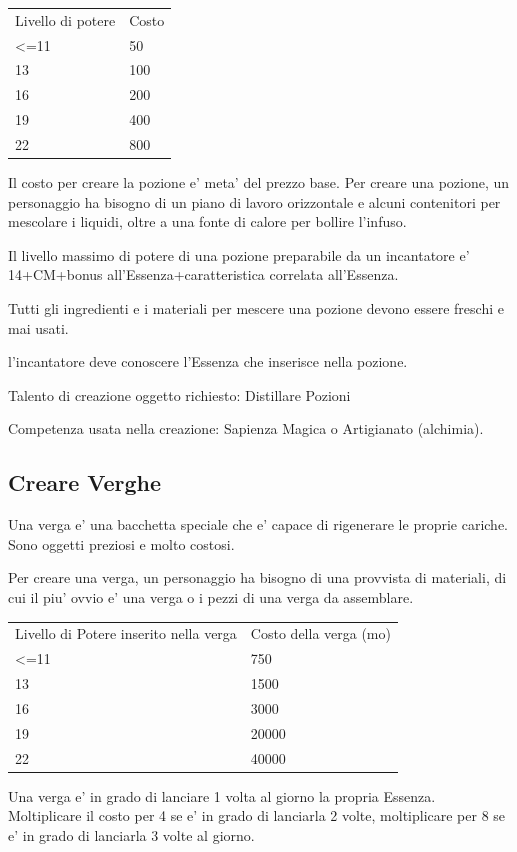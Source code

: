 \documentclass[a4paper,11pt,twoside,openany]{dndbook}
\begin{document}
{\bigskip

\begin{tabular}[c]{@{}ll@{}}
\toprule 
Livello di potere & Costo\tabularnewline
\textless=11 & 50\tabularnewline
13 & 100\tabularnewline
16 & 200\tabularnewline
19 & 400\tabularnewline
22 & 800\tabularnewline
\bottomrule
\end{tabular}

\bigskip

Il costo per creare la pozione e' meta' del prezzo base. Per creare una pozione, un personaggio ha bisogno di un piano di lavoro orizzontale e alcuni contenitori per mescolare i liquidi, oltre a una fonte di calore per bollire l'infuso.

Il livello massimo di potere di una pozione preparabile da un incantatore e' 14+CM+bonus all'Essenza+caratteristica correlata all'Essenza.

Tutti gli ingredienti e i materiali per mescere una pozione devono essere freschi e mai usati.

l'incantatore deve conoscere l'Essenza che inserisce nella pozione.

Talento di creazione oggetto richiesto: Distillare Pozioni

Competenza usata nella creazione: Sapienza Magica o Artigianato (alchimia).

\subsection{Creare Verghe}

Una verga e' una bacchetta speciale che e' capace di rigenerare le proprie cariche. Sono oggetti preziosi e molto costosi.

Per creare una verga, un personaggio ha bisogno di una provvista di materiali, di cui il piu' ovvio e' una verga o i pezzi di una verga da assemblare.

\begin{tabular}[c]{@{}ll@{}}
\toprule 
Livello di Potere inserito nella verga & Costo della verga (mo)\tabularnewline
\textless=11 & 750\tabularnewline
13 & 1500\tabularnewline
16 & 3000\tabularnewline
19 & 20000\tabularnewline
22 & 40000\tabularnewline
\bottomrule
\end{tabular}

\bigskip

Una verga e' in grado di lanciare 1 volta al giorno la propria Essenza. Moltiplicare il costo per 4 se e' in grado di lanciarla 2 volte, moltiplicare per 8 se e' in grado di lanciarla 3 volte al giorno. 

}
\end{document}
